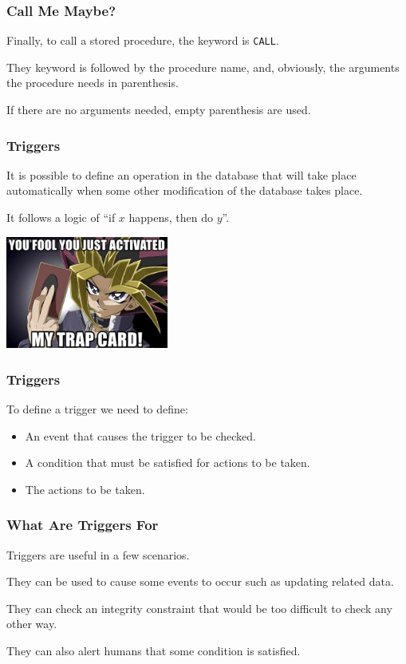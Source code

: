 \begin{frame}
\frametitle{Call Me Maybe?}

Finally, to call a stored procedure, the keyword is \texttt{CALL}.

They keyword is followed by the procedure name, and, obviously, the arguments the procedure needs in parenthesis.

If there are no arguments needed, empty parenthesis are used.

\end{frame}


\begin{frame}
\frametitle{Triggers}

It is possible to define an operation in the database that will take place automatically when some other modification of the database takes place. 

It follows a logic of ``if $x$ happens, then do $y$''. 

\begin{center}
	\includegraphics[width=0.4\textwidth]{images/trapcard.png}
\end{center}

\end{frame}


\begin{frame}
\frametitle{Triggers}

To define a trigger we need to define:
\begin{itemize}
	\item An event that causes the trigger to be checked.
	\item A condition that must be satisfied for actions to be taken.
	\item The actions to be taken.
\end{itemize}

\end{frame}

\begin{frame}
\frametitle{What Are Triggers For}

Triggers are useful in a few scenarios. 

They can be used to cause some events to occur such as updating related data.

They can check an integrity constraint that would be too difficult to check any other way. 

They can also alert humans that some condition is satisfied. 

\end{frame}

